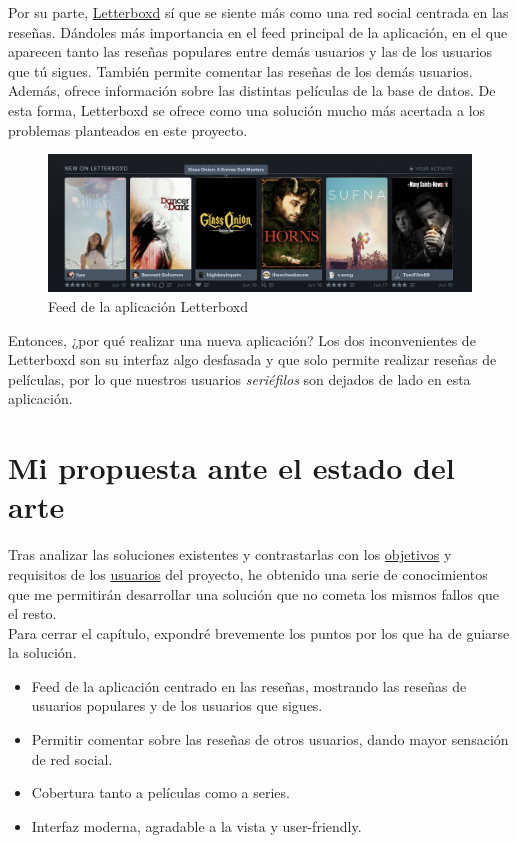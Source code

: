 Por su parte, \href{https://letterboxd.com}{Letterboxd} sí que se siente más como una red social centrada en las
reseñas. Dándoles más importancia en el feed principal de la aplicación, en el que aparecen tanto las reseñas populares
entre demás usuarios y las de los usuarios que tú sigues. También permite comentar las reseñas de los demás usuarios.
Además, ofrece información sobre las distintas películas de la base de datos. De esta forma, Letterboxd se ofrece como
una solución mucho más acertada a los problemas planteados en este proyecto.\\
\begin{figure}[H]
    \centering	
    \includegraphics[scale=0.4]{img/letterboxd-feed.png}
    \caption{ Feed de la aplicación Letterboxd }\label{fig:letterboxd}
\end{figure}

Entonces, ¿por qué realizar una nueva aplicación? Los dos inconvenientes de Letterboxd son su interfaz algo desfasada
y que solo permite realizar reseñas de películas, por lo que nuestros usuarios \textit{seriéfilos} son dejados de lado
en esta aplicación.\\

\section{Mi propuesta ante el estado del arte}

Tras analizar las soluciones existentes y contrastarlas con los \hyperref[sec:objetivo]{objetivos} y requisitos de los
\hyperref[chap:personas]{usuarios} del proyecto, he obtenido una serie de conocimientos que me permitirán desarrollar
una solución que no cometa los mismos fallos que el resto. \\

Para cerrar el capítulo, expondré brevemente los puntos por los que ha de guiarse la solución. 
\begin{itemize}
    \item Feed de la aplicación centrado en las reseñas, mostrando las reseñas de usuarios populares y de los usuarios
    que sigues.
    \item Permitir comentar sobre las reseñas de otros usuarios, dando mayor sensación de red social.
    \item Cobertura tanto a películas como a series.
    \item Interfaz moderna, agradable a la vista y user-friendly.
\end{itemize}